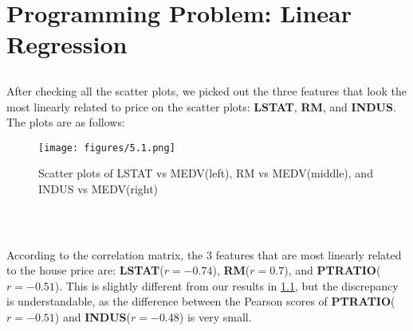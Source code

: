 \documentclass{article}
\begin{document}
        \subsection{}


        \subsection{}


        \subsection{}


        \subsection{}
        

        \subsection{}
        

    \section{Programming Problem: Linear Regression}

        \subsection{}\label{5.1}
        After checking all the scatter plots, we picked out the three features that look the most linearly related to price on the scatter plots:
        \textbf{LSTAT}, \textbf{RM}, and \textbf{INDUS}. The plots are as follows:
        \begin{figure}[hbt!]
            \centering
            \texttt{[image: figures/5.1.png]}
            \caption{Scatter plots of LSTAT vs MEDV(left), RM vs MEDV(middle), and INDUS vs MEDV(right)}
        \end{figure}\\
        
        \subsection{}
        According to the correlation matrix, the 3 features that are most linearly related to the house price are:
        \textbf{LSTAT}($r=-0.74$), \textbf{RM}($r=0.7$), and \textbf{PTRATIO}($r=-0.51$). This is slightly different from our results in \ref{5.1}, 
        but the discrepancy is understandable, as the difference between the Pearson scores of \textbf{PTRATIO}($r=-0.51$) and \textbf{INDUS}($r=-0.48$) is very small.
\end{document}
